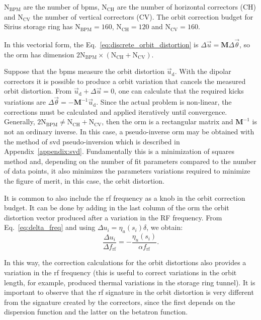 $\mathrm{N}_{\mathrm{BPM}}$ are the number of \gls{bpm}s, $\mathrm{N}_{\mathrm{CH}}$ are the number of horizontal correctors (CH) and $\mathrm{N}_{\mathrm{CV}}$ the number of vertical correctors (CV). The orbit correction budget for Sirius storage ring has $\mathrm{N}_{\mathrm{BPM}} = 160$, $\mathrm{N}_{\mathrm{CH}} = 120$ and $\mathrm{N}_{\mathrm{CV}} = 160$. 

In this vectorial form, the Eq.~\eqref{eq:discrete_orbit_distortion} is $\Delta \vec{u} = \mathbf{M} \Delta \vec{\theta}$, so the \gls{orm} has dimension $2 \mathrm{N}_{\mathrm{BPM}} \times \left(\mathrm{N}_{\mathrm{CH}} + \mathrm{N}_{\mathrm{CV}}\right)$. 

Suppose that the \gls{bpm}s measure the orbit distortion $\vec{u}_{\mathrm{d}}$. With the dipolar correctors it is possible to produce a orbit variation that cancels the measured orbit distortion. From $\vec{u}_{\mathrm{d}} + \Delta \vec{u} = 0$, one can calculate that the required kicks variations are $\Delta \vec{\theta} = -\mathbf{M}^{-1}\vec{u}_{\mathrm{d}}$. Since the actual problem is non-linear, the corrections must be calculated and applied iteratively until convergence. Generally, $2\mathrm{N}_{\mathrm{BPM}} \neq \mathrm{N}_{\mathrm{CH}} + \mathrm{N}_{\mathrm{CV}}$, then the \gls{orm} is a rectangular matrix and $\mathbf{M}^{-1}$ is not an ordinary inverse. In this case, a pseudo-inverse \gls{orm} may be obtained with the method of \gls{svd} pseudo-inversion which is described in Appendix~\ref{appendix:svd}. Fundamentally this is a minimization of squares method and, depending on the number of fit parameters compared to the number of data points, it also minimizes the parameters variations required to minimize the figure of merit, in this case, the orbit distortion.

It is common to also include the \gls{rf} frequency as a knob in the orbit correction budget. It can be done by adding in the last column of the \gls{orm} the orbit distortion vector produced after a variation in the RF frequency. From Eq.~\eqref{eq:delta_freq} and using $\Delta u_i = \eta_u(s_i) \delta$, we obtain:
\begin{equation}
    \dfrac{\Delta u_i}{ \Delta f_{\mathrm{rf}}} = - \dfrac{\eta_u(s_i)}{\alpha f_{\mathrm{rf}}}.
    \label{eq:rf_column}
\end{equation}

In this way, the correction calculations for the orbit distortions also provides a variation in the \gls{rf} frequency (this is useful to correct variations in the orbit length, for example, produced thermal variations in the storage ring tunnel). It is important to observe that the \gls{rf} signature in the orbit distortion is very different from the signature created by the correctors, since the first depends on the dispersion function and the latter on the betatron function.

